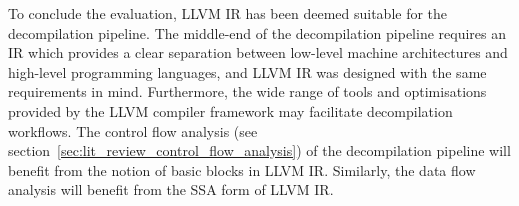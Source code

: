 To conclude the evaluation, LLVM IR has been deemed suitable for the decompilation pipeline. The middle-end of the decompilation pipeline requires an IR which provides a clear separation between low-level machine architectures and high-level programming languages, and LLVM IR was designed with the same requirements in mind. Furthermore, the wide range of tools and optimisations provided by the LLVM compiler framework may facilitate decompilation workflows. The control flow analysis (see section~\ref{sec:lit_review_control_flow_analysis}) of the decompilation pipeline will benefit from the notion of basic blocks in LLVM IR. Similarly, the data flow analysis will benefit from the SSA form of LLVM IR.
